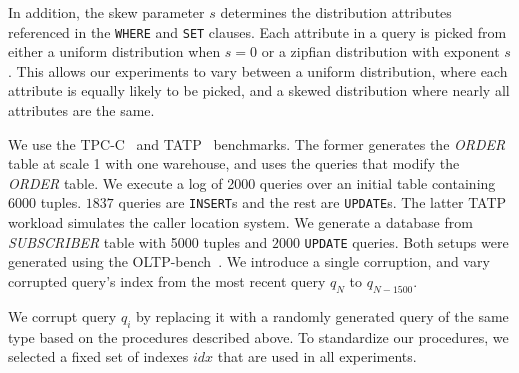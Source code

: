 In addition, the skew parameter $s$ determines the distribution attributes referenced in the \texttt{WHERE} and \texttt{SET} clauses.  
Each attribute in a query is picked from either a uniform distribution when $s=0$ or a zipfian distribution with exponent $s$.
This allows our experiments to vary between a uniform distribution, where each attribute is
equally likely to be picked, and a skewed distribution where nearly all attributes are the same. 

 We use the TPC-C~\cite{tpcc} and TATP~\cite{tatp} benchmarks.
The former generates the {\it ORDER} table at scale 1 with one warehouse, and uses the queries that modify the {\it ORDER} table. 
We execute a log of 2000 queries over an initial table containing 6000 tuples.  
$1837$ queries are \texttt{INSERT}s and the rest are \texttt{UPDATE}s. 
The latter TATP workload simulates the caller location system. 
We generate a database from {\it SUBSCRIBER} table with 5000 tuples and $2000$ \texttt{UPDATE} queries.
Both setups were generated using the OLTP-bench~\cite{difallah2013oltp}. 
We introduce a single corruption, and vary corrupted query's index from the most recent query $q_N$ to $q_{N-1500}$.



 We corrupt query $q_i$ by replacing it with a randomly
generated query of the same type based on the procedures described above.
To standardize our procedures, we selected a fixed set of indexes $idx$
that are used in all experiments. 








